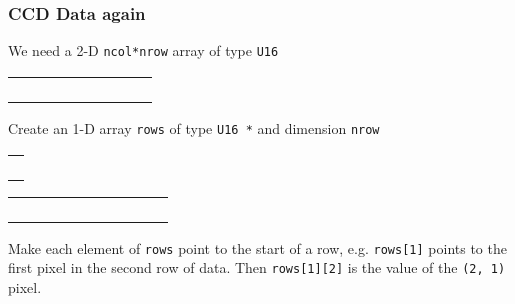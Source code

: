 \documentclass[10pt, t]{beamer}
\begin{document}
\begin{frame}
\frametitle{CCD Data again}
\label{sec-5_1_20}

We need a 2-D \texttt{ncol*nrow} array of type \texttt{U16}


\begin{center}
\begin{tabular}{|*{9}{l|}}
\hline
 \null  &     &     &     &     &     &     &     &     \\
\hline
 \null  &     &     &     &     &     &     &     &     \\
\hline
 \null  &     &     &     &     &     &     &     &     \\
\hline
 \null  &     &     &     &     &     &     &     &     \\
\hline
 \null  &     &     &     &     &     &     &     &     \\
\hline
\end{tabular}
\end{center}



\pause Create an 1-D array \texttt{rows} of type \texttt{U16 *} and dimension \texttt{nrow}

\begin{center}
\begin{tabular}{|l|}
\hline
  \\
\hline
  \\
\hline
  \\
\hline
  \\
\hline
  \\
\hline
\end{tabular}
\pause
\begin{tabular}{|l|l|l|l|l|l|l|l|l|l|}
\hline
    &     &    &     &     &     &     &     & \\
\hline
    &     &    &     &     &     &     &     & \\
\hline
    &     &    &     &     &     &     &     & \\
\hline
    &     &    &     &     &     &     &     & \\
\hline
    &     &    &     &     &     &     &     & \\
\hline
\end{tabular}
\end{center}

Make each element of \texttt{rows} point to the start of a row, e.g. \texttt{rows[1]} points to the first pixel
in the second row of data.  Then \texttt{rows[1][2]} is the value of the \texttt{(2, 1)} pixel.
\end{frame}
\end{document}

